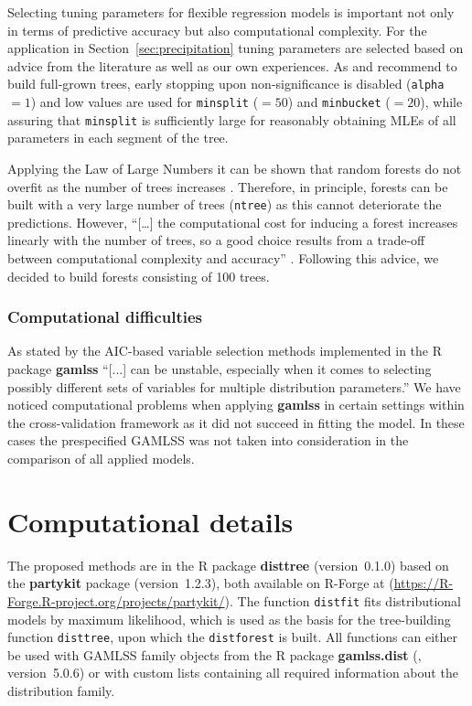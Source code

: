 \documentclass[aoas, preprint]{imsart}
\numberwithin{equation}{subsection}
\begin{document}
Selecting tuning parameters for flexible regression models is important
not only in terms of predictive accuracy but also computational complexity. 
For the application in Section~\ref{sec:precipitation} tuning parameters
are selected based on advice from the literature as well as our own experiences.
As \cite{Hastie+Tibshirani+Friedman:2001} and \cite{Breiman:2001} recommend to 
build full-grown trees, early stopping upon non-significance is disabled
(\texttt{alpha} $= 1$) and low values are used for \texttt{minsplit} ($ = 50$)
and \texttt{minbucket} ($ = 20$), while assuring that \texttt{minsplit}
is sufficiently large for reasonably obtaining MLEs of all parameters in each
segment of the tree.

Applying the Law of Large Numbers it can be shown that random forests do not overfit 
as the number of trees increases
\citep{Breiman:2001,Hastie+Tibshirani+Friedman:2001,Biau+Scornet:2016}.
Therefore, in principle, forests can be built with a very large number of trees
(\texttt{ntree}) as this cannot deteriorate the predictions. However, ``[\dots] the
computational cost for inducing a forest increases linearly with the number of trees,
so a good choice results from a trade-off between computational complexity and accuracy''
\citep[][p.~205]{Biau+Scornet:2016}.
Following this advice, we decided to build forests consisting of 100 trees.

\subsubsection*{Computational difficulties}
As stated by \cite{Hofner+Mayr+Schmid:2016} the AIC-based variable selection 
methods implemented in the \textsf{R} package \textbf{gamlss} ``[...] can be 
unstable, especially when it comes to selecting possibly different sets of variables for 
multiple distribution parameters.'' We have noticed computational problems when
applying \textbf{gamlss} in certain settings within the cross-validation
framework as it did not succeed in fitting the model. In these cases the prespecified
GAMLSS was not taken into consideration in the comparison of all applied models.


\section*{Computational details}

The proposed methods are in the \textsf{R} package \textbf{disttree}
(version~0.1.0) based on the \textbf{partykit}
package (version~1.2.3), both available 
on \textsf{R}-Forge at
(\url{https://R-Forge.R-project.org/projects/partykit/}). The function
\texttt{distfit} fits distributional models by maximum likelihood, which is
used as the basis for the tree-building function \texttt{disttree}, upon which
the \texttt{distforest} is built. All functions can either be used with
GAMLSS family objects from the \textsf{R} package \textbf{gamlss.dist} 
(\citealp{Stasinopoulos+Rigby:2007}, version~5.0.6)
or with custom lists containing all required information about the distribution family.
\end{document}
